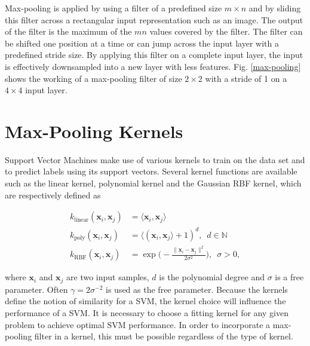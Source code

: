 \documentclass[10pt,twocolumn,letterpaper]{article}
\begin{document}
Max-pooling is applied by using a filter of a predefined size $m \times n$ and by sliding this filter across a rectangular input representation such as an image.
The output of the filter is the maximum of the $mn$ values covered by the filter. 
The filter can be shifted one position at a time or can jump across the input layer with a predefined stride size.
By applying this filter on a complete input layer, the input is effectively downsampled into a new layer with less features. 
Fig. \ref{max-pooling} shows the working of a max-pooling filter of size $2\times 2$ with a stride of 1 on a $4\times 4$ input layer.







\section{Max-Pooling Kernels}

Support Vector Machines \cite{vapnikNatureStatisticalLearning1995} make use of various kernels to train on the data set and to predict labels using its support vectors. 
Several kernel functions are available such as the linear kernel, polynomial kernel and the Gaussian RBF kernel, which are respectively defined as

\begin{align}
	k_{\text{linear}}(\textbf{x}_i, \textbf{x}_j) & = \langle \textbf{x}_i, \textbf{x}_j\rangle\\
	k_{\text{poly}}(\textbf{x}_i, \textbf{x}_j) & = \langle (\textbf{x}_i, \textbf{x}_j\rangle + 1)^d, \enspace d\in \mathbb{N}\\
	k_{\text{RBF}}(\textbf{x}_i, \textbf{x}_j) & = \exp \bigg(- \frac{\| \textbf{x}_i - \textbf{x}_j \|^2}{2\sigma ^2}\bigg), \enspace \sigma > 0,
\end{align}


\noindent where $\textbf{x}_i$ and $\textbf{x}_j$ are two input samples, $d$ is the polynomial degree and $\sigma$ is a free parameter. Often $\gamma = 2\sigma^{-2}$ is used as the free parameter. 
\noindent Because the kernels define the notion of similarity for a SVM, the kernel choice will influence the performance of a SVM. 
It is necessary to choose a fitting kernel for any given problem to achieve optimal SVM performance.
In order to incorporate a max-pooling filter in a kernel, this must be possible regardless of the type of kernel. 
\end{document}
